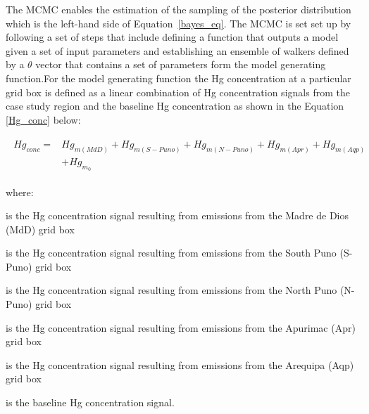 \begin{flushleft}
The MCMC enables the estimation of the sampling of the posterior distribution which is the left-hand side of Equation~\ref{bayes_eq}. The MCMC is set set up by following a set of steps that include defining a function that outputs a model given a set of input parameters and establishing an ensemble of walkers defined by a $\theta$ vector that contains a set of parameters form the model generating function.For the model generating function the Hg concentration at a particular grid box is defined as a linear combination of Hg concentration signals from the case study region and the baseline Hg concentration as shown in the Equation \ref{Hg_conc} below:

\begin{align}
\begin{split}\label{Hg_conc}
Hg_{conc}= {}&Hg_{m(MdD)}+ Hg_{m(S-Puno)} + Hg_{m(N-Puno)} + Hg_{m(Apr)}+ Hg_{m(Aqp)}\\
            & +Hg_{m_0}
\end{split}
\end{align}

where:
\end{flushleft}

\begin{description}[leftmargin=!,labelwidth={5 em}]
    \item [$Hg_{m(MdD)}$] is the Hg concentration signal resulting from emissions from the Madre de Dios (MdD) grid box
    \item [$Hg_{m(S-Puno)}$] is the Hg concentration signal resulting from emissions from the South Puno (S-Puno) grid box
    \item [$Hg_{m(N-Puno)}$] is the Hg concentration signal resulting from emissions from the North Puno (N-Puno) grid box
    \item [$Hg_{m(Apr)}$] is the Hg concentration signal resulting from emissions from the Apurimac (Apr) grid box
    \item [$Hg_{m(Aqp)}$] is the Hg concentration signal resulting from emissions from the Arequipa (Aqp) grid box
    \item [$Hg_{m_0}$] is the baseline Hg concentration signal.
\end{description}

